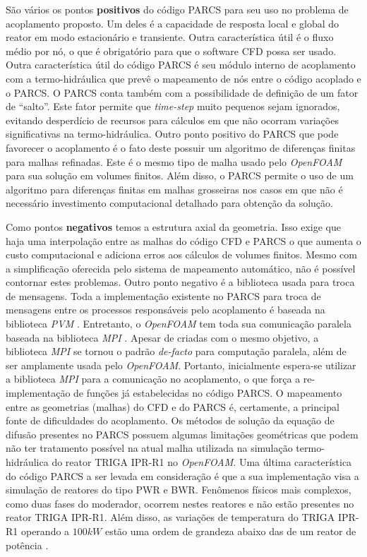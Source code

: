 \documentclass[12pt,openright,twoside,a4paper,english,french,spanish,brazil]{abntex2}
\begin{document}
São vários os pontos \textbf{positivos} do código PARCS para seu uso no problema de acoplamento proposto. 
Um deles é a capacidade de resposta local e global do reator em modo estacionário e transiente.
Outra característica útil é o fluxo médio por nó, o que é obrigatório para que o software CFD 
possa ser usado. Outra característica útil do código PARCS é seu módulo interno de acoplamento 
com a termo-hidráulica que prevê o mapeamento de nós entre o código acoplado e o PARCS.
O PARCS conta também com a possibilidade de definição de um fator de ``salto''. Este fator 
permite que \textit{time-step} muito pequenos sejam ignorados, evitando desperdício de recursos 
para cálculos em que não ocorram variações significativas na termo-hidráulica. Outro ponto 
positivo do PARCS que pode favorecer o acoplamento é o fato deste possuir um algoritmo de 
diferenças finitas para malhas refinadas. Este é o mesmo tipo de malha usado pelo \textit{OpenFOAM} 
para sua solução em volumes finitos. Além disso, o PARCS permite o uso de um algoritmo para diferenças 
finitas em malhas grosseiras nos casos em que não é necessário investimento computacional detalhado 
para obtenção da solução.

Como pontos \textbf{negativos} temos a estrutura axial da geometria. Isso exige que haja uma interpolação 
entre as malhas do código CFD e PARCS o que aumenta o custo computacional e adiciona erros aos 
cálculos de volumes finitos. Mesmo com a simplificação oferecida pelo sistema de mapeamento automático, 
não é possível contornar estes problemas. Outro ponto negativo é a biblioteca usada para troca de mensagens. 
Toda a implementação existente no PARCS para troca de mensagens entre os processos responsáveis pelo 
acoplamento é baseada na biblioteca \textit{PVM} \cite{Geist94}. Entretanto, o \textit{OpenFOAM} tem toda sua 
comunicação paralela baseada na biblioteca \textit{MPI} \cite{Quinn2004}. Apesar de criadas com o mesmo objetivo, 
a biblioteca \textit{MPI} se tornou o padrão \textit{de-facto} para computação paralela, além de ser amplamente usada 
pelo \textit{OpenFOAM}. Portanto, inicialmente espera-se utilizar 
a biblioteca \textit{MPI} para a comunicação no acoplamento, o que força a re-implementação de funções 
já estabelecidas no código PARCS. O mapeamento entre as geometrias (malhas) do CFD e do PARCS é, certamente, 
a principal fonte de dificuldades do acoplamento. Os métodos de solução da equação de difusão presentes no PARCS 
possuem algumas limitações geométricas que podem não ter tratamento possível na atual malha utilizada 
na simulação termo-hidráulica do reator TRIGA IPR-R1 no \textit{OpenFOAM}. Uma última característica do código 
PARCS a ser levada em consideração é que a sua implementação visa a simulação de reatores do tipo PWR e BWR. 
Fenômenos físicos mais complexos, como duas fases do moderador, ocorrem nestes reatores e não 
estão presentes no reator TRIGA IPR-R1. Além disso, as variações de temperatura do TRIGA IPR-R1 operando a $100kW$ 
estão uma ordem de grandeza abaixo das de um reator de potência \cite{Martinez2012}. 
\end{document}
